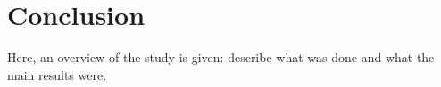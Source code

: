 \documentclass{article}
\begin{document}
\section{Conclusion}
\label{sec:conclusion}

Here, an overview of the study is given: describe what was done and what the main results were.


\small






\vfill\pagebreak
\end{document}
